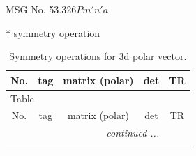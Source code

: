 \documentclass[fleqn,8pt]{jsarticle}
\begin{document}
\setcounter{MaxMatrixCols}{32}

\renewcommand{\tablename}{Table~}
\renewcommand{\figurename}{Figure~}
\begin{center}
\LARGE
MSG No. 53.326\quad$Pm'n'a$
\end{center}
* symmetry operation
\renewcommand{\arraystretch}{1.3}
\begin{longtable}{ccccc}
\caption{Symmetry operations for 3d polar vector.}
 \\
 \hline \hline
No. & tag & matrix (polar) & det & TR \\ \hline \endfirsthead

\multicolumn{4}{l}{\tablename\ \thetable{}} \\
 \hline \hline
No. & tag & matrix (polar) & det & TR \\ \hline \endhead

 \hline \hline
\multicolumn{4}{r}{\footnotesize\it continued ...} \\ \endfoot

 \hline \hline
\multicolumn{4}{r}{} \\ \endlastfoot


\end{longtable}
\end{document}
